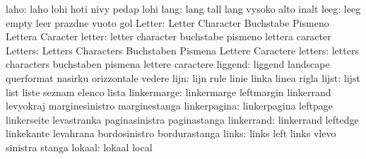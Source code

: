                      laho: laho                      lohi
                           hoti                      nivy
                           pedap                     lohi %
                     lang: lang                      tall
                           lang                      vysoko
                           alto                      inalt %
                     leeg: leeg                      empty
                           leer                      prazdne
                           vuoto                     gol
                   Letter: Letter                    Character
                           Buchstabe                 Pismeno
                           Lettera                   Caracter
                   letter: letter                    character
                           buchstabe                 pismeno
                           lettera                   caracter
                  Letters: Letters                   Characters
                           Buchstaben                Pismena
                           Lettere                   Caractere
                  letters: letters                   characters
                           buchstaben                pismena
                           lettere                   caractere
                  liggend: liggend                   landscape
                           querformat                nasirku
                           orizzontale               vedere
                     lijn: lijn                      rule
                           linie                     linka
                           linea                     rigla
                    lijst: lijst                     list
                           liste                     seznam
                           elenco                    lista
              linkermarge: linkermarge               leftmargin
                           linkerrand                levyokraj
                           marginesinistro           marginestanga
             linkerpagina: linkerpagina              leftpage
                           linkerseite               levastranka
                           paginasinistra            paginastanga
               linkerrand: linkerrand                leftedge
                           linkekante                levahrana
                           bordosinistro             bordurastanga
                    links: links                     left
                           links                     vlevo
                           sinistra                  stanga
                   lokaal: lokaal                    local
